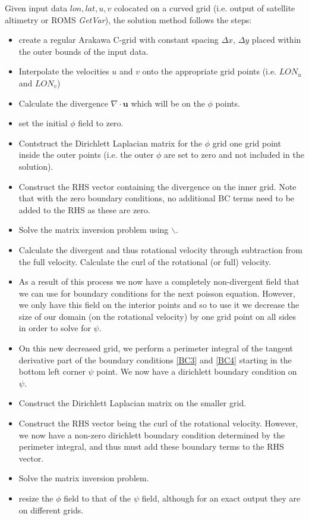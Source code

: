\documentclass{article}
\begin{document}
\noindent Given input data $lon,lat,u,v$ colocated on a curved
grid (i.e. output of satellite altimetry or ROMS \emph{GetVar}), the
solution method follows the steps:
\begin{itemize}
\item create a regular Arakawa C-grid with constant spacing $\Delta
  x$, $\Delta y$ placed within the outer bounds of the input data.
\item Interpolate the velocities $u$ and $v$ onto the appropriate grid
  points (i.e. $LON_u$ and $LON_v$)
\item Calculate the divergence $\nabla\cdot\bm{u}$ which will be on
  the $\phi$ points. 
\item set the initial $\phi$ field to zero.
\item Contstruct the Dirichlett Laplacian matrix for the $\phi$ grid
  one grid point inside the outer points (i.e. the outer $\phi$ are
  set to zero and not included in the solution). 
\item Construct the RHS vector containing the divergence on the inner
  grid. Note that with the zero boundary conditions, no additional BC
  terms need to be added to the RHS as these are zero.
\item Solve the matrix inversion problem using $\backslash$.
\item Calculate the divergent and thus rotational velocity through
  subtraction from the full velocity. Calculate the curl of the
  rotational (or full) velocity.
\item As a result of this process we now have a completely
  non-divergent field that we can use for boundary conditions for the
  next poisson equation. However, we only have this field on the
  interior points and so to use it we decrease the size of our domain
  (on the rotational velocity) by one grid point on all sides in order
  to solve for $\psi$. 
\item On this new decreased grid, we perform a perimeter integral of
  the tangent derivative part of the boundary conditions \eqref{BC3}
  and \eqref{BC4} starting in the bottom left corner $\psi$ point. We
  now have a dirichlett boundary condition on $\psi$.
\item Construct the Dirichlett Laplacian matrix on the smaller grid.
\item Construct the RHS vector being the curl of the rotational
  velocity. However, we now have a non-zero dirichlett boundary
  condition determined by the perimeter integral, and thus must add
  these boundary terms to the RHS vector.
\item Solve the matrix inversion problem.
\item resize the $\phi$ field to that of the $\psi$ field, although
  for an exact output they are on different grids.
\end{itemize}
 
\end{document}
